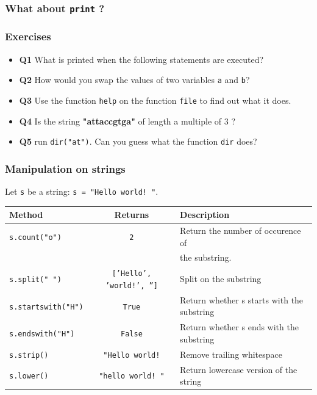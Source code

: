 \documentclass[xcolor=dvipsnames]{beamer}
\begin{document}
\begin{frame}
\frametitle{What about \texttt{print} ?}
\end{frame}

\begin{frame}
\frametitle{Exercises}
\begin{itemize}
\item \textbf{Q1} What is printed when the following statements are executed?

\item \textbf{Q2} How would you swap the values of two variables \texttt{a}
and \texttt{b}?
\item \textbf{Q3} Use the function \texttt{help} on the function \texttt{file}
to find out what it does.
\item \textbf{Q4} Is the string \textbf{"attaccgtga"} of length a multiple of
3 ?
\item \textbf{Q5} run \texttt{dir("at")}. Can you guess what the function
\texttt{dir} does?
\end{itemize}
\end{frame}

\begin{frame}
\frametitle{Manipulation on strings}

Let \texttt{s} be a string: \texttt{s = "Hello world! "}.

\begin{table}
\scriptsize
\begin{tabular}{lcl}
Method & Returns & Description \\
\hline
\texttt{s.count("o")} & \texttt{2} & Return the number of occurence of \\
		      &		   & the substring. \\
\texttt{s.split(" ")} & {\tiny \texttt{['Hello', 'world!', '']}} & Split on the substring \\
\texttt{s.startswith("H")} & \texttt{True} & Return whether s starts with the
substring \\
\texttt{s.endswith("H")} & \texttt{False} & Return whether s ends with the
substring \\
\texttt{s.strip()} & \texttt{"Hello world!} & Remove trailing whitespace \\
\texttt{s.lower()} & \texttt{"hello world! "} & Return lowercase version of
the string \\
\end{tabular}
\end{table}

\vspace{1em}

\end{frame}
\end{document}
